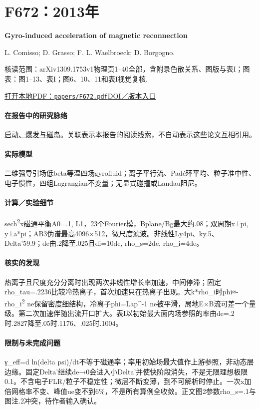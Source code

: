 \documentclass[UTF8,a4paper,11pt,openany,fontset=fandol]{ctexbook}
\begin{document}
\section{F672：2013年}\label{paper:F672}

\textbf{Gyro-induced acceleration of magnetic reconnection}\citep{F672}\

L. Comisso;  D. Grasso;  F. L. Waelbroeck;  D. Borgogno.

\textsf{核读范围：}arXiv1309.1753v1物理页1–40全部，含附录色散关系、图版与表I；\textsf{图表：}图1–13、表I；图6、10、11和表I视觉复核.

\href{run:../papers/F672.pdf}{打开本地PDF：\texttt{papers/F672.pdf}}\quad\href{https://doi.org/10.1063/1.4821840}{DOI／版本入口}

\paragraph{在报告中的研究脉络}\hyperref[story:onset]{启动、爆发与磁岛}。关联表示本报告的阅读线索，不自动表示这些论文互相引用。

\paragraph{实际模型}二维强导引场低beta等温四场gyrofluid；离子平行流、Padé环平均、粒子准中性、电子惯性，四组Lagrangian不变量；无显式碰撞或Landau阻尼。

\paragraph{计算／实验细节}sech\textsuperscript{2}x磁通平衡A0=.1, L1，23个Fourier模，Bplane/Bg最大约.08；双周期x±pi, y±a*pi；AB3伪谱最高4096×512，微尺度滤波。非线性Ly4pi、ky.5、Delta'59.9；de由.2降至.025且di=10de, rho\_s=2de, rho\_i=4de。

\paragraph{核实的发现}热离子且尺度充分分离时出现两次非线性增长率加速，中间停滞；固定rho\_tau=.2236比较冷热离子，首次加速只在热离子出现。大k*rho\_i时phi≈-rho\_i\textsuperscript{2} ne保留密度细结构，冷离子phi=Lap\textasciicircum{}-1 ne被平滑，局地E×B流可差一个量级。第二次加速伴随出流开口扩大。表I以初始最大面内场参照的率由de=.2时.2827降至.05时.1176、.025时.1004。

\paragraph{限制与未完成问题}γ\_eff=d ln(delta psi)/dt不等于磁通率；率用初始场最大值作上游参照，非动态层边缘。固定Delta'继续de→0会进入小Delta'并使快阶段消失，不是无限理想极限0.1。不含电子FLR/粒子不稳定性；微层不断变薄，到不可解析时停止。一次x加倍网格率不变、峰值ue变不到6\%，不是所有算例全收敛。正文图2参数rho\_s=.1与图注.2冲突，待作者输入确认。
\end{document}
